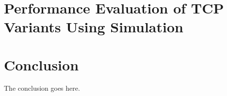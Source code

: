 \documentclass[journal,transmag]{IEEEtran}
\begin{document}





\section{Performance Evaluation of TCP Variants Using Simulation}


\section{Conclusion}
The conclusion goes here.






\ifCLASSOPTIONcaptionsoff
  \newpage
\fi








\end{document}
